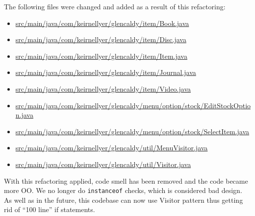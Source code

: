 \documentclass{article}
\newcommand{\code}[1]{\texttt{#1}}
\begin{document}
The following files were changed and added as a result of this refactoring:
\begin{itemize}
  \item \href{https://github.com/awave1/assessment-loan-system/commit/2534ae1e8b711ad62fca8e783b861151951a8f02#diff-54a69d7c35e29e31112b9482279f7728}{src/main/java/com/keirnellyer/glencaldy/item/Book.java}
  \item \href{https://github.com/awave1/assessment-loan-system/commit/2534ae1e8b711ad62fca8e783b861151951a8f02#diff-ffa15ba834ac42bda93108046f2e3e1d}{src/main/java/com/keirnellyer/glencaldy/item/Disc.java}
  \item \href{https://github.com/awave1/assessment-loan-system/commit/2534ae1e8b711ad62fca8e783b861151951a8f02#diff-1fa65bd290d78e7f9e8a0983709d279f}{src/main/java/com/keirnellyer/glencaldy/item/Item.java}
  \item \href{https://github.com/awave1/assessment-loan-system/commit/2534ae1e8b711ad62fca8e783b861151951a8f02#diff-fd27721b429fa9fc4dbaf6aabcd2512d}{src/main/java/com/keirnellyer/glencaldy/item/Journal.java}
  \item \href{https://github.com/awave1/assessment-loan-system/commit/2534ae1e8b711ad62fca8e783b861151951a8f02#diff-3d39eb9fe1d2e7bb2073c8b6e612eaa2}{src/main/java/com/keirnellyer/glencaldy/item/Video.java}
  \item \href{src/main/java/com/keirnellyer/glencaldy/menu/option/stock/EditStockOption.java}{src/main/java/com/keirnellyer/glencaldy/menu/option/stock/EditStockOption.java}
  \item \href{src/main/java/com/keirnellyer/glencaldy/menu/option/stock/SelectItem.java}{src/main/java/com/keirnellyer/glencaldy/menu/option/stock/SelectItem.java}
  \item \href{https://github.com/awave1/assessment-loan-system/commit/2534ae1e8b711ad62fca8e783b861151951a8f02#diff-73e174fc5f923546624d5c4206572c47}{src/main/java/com/keirnellyer/glencaldy/util/MenuVisitor.java}
  \item \href{https://github.com/awave1/assessment-loan-system/commit/2534ae1e8b711ad62fca8e783b861151951a8f02#diff-ce10c0cc207b42495013fef20915f5ab}{src/main/java/com/keirnellyer/glencaldy/util/Visitor.java}
\end{itemize}



With this refactoring applied, code smell has been removed and the code became more OO. We no longer do \code{instanceof} checks, which is considered bad design. As well as in the future, this codebase can now use Visitor pattern thus getting rid of ``100 line'' if statements.
\end{document}
